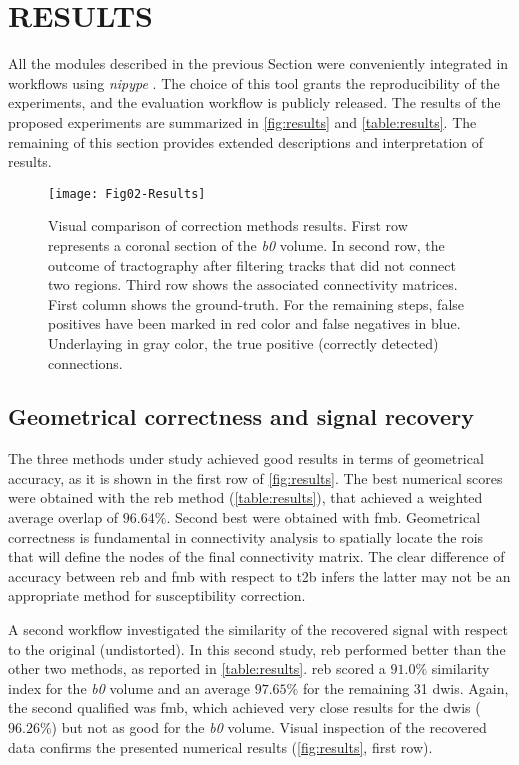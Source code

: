 \section{RESULTS}
\label{sec:results}

All the modules described in the previous Section were
conveniently integrated in workflows using \emph{nipype}
\cite{gorgolewski_nipype:_2011}. The choice of this tool
grants the reproducibility of the experiments,
and the evaluation workflow is publicly released.
The results of the proposed experiments are summarized
in \autoref{fig:results} and \autoref{table:results}.
The remaining of this section provides extended descriptions
and interpretation of results.

\begin{figure*}[tpb]
   \centering
   \texttt{[image: Fig02-Results]}
   \caption{Visual comparison of correction methods results. 
   First row represents
   a coronal section of the \textit{b0} volume. In second row, the outcome
   of tractography after filtering tracks that did not connect two regions.
   Third row shows the associated connectivity matrices. First column shows
   the ground-truth. For the remaining steps, false positives have been marked
   in red color and false negatives in blue. Underlaying in gray color,
   the true positive (correctly detected) connections. }
   \label{fig:results}
\end{figure*}


\subsection{Geometrical correctness and signal recovery}

The three methods under study achieved good results in
terms of geometrical accuracy, as it is shown in the first
row of \autoref{fig:results}. The best numerical scores
were obtained with the \gls*{reb} method (\autoref{table:results}),
that achieved a weighted average overlap of $96.64\%$. Second
best were obtained with \gls*{fmb}. Geometrical correctness
is fundamental in connectivity analysis to spatially locate the
\glspl*{roi} that will define the nodes of the final connectivity
matrix. The clear difference of accuracy between \gls*{reb} and \gls*{fmb}
with respect to \gls*{t2b} infers the latter may not be
an appropriate method for susceptibility correction.



A second workflow investigated the similarity of the recovered
signal with respect to the original (undistorted).
In this second study, \gls*{reb} performed
better than the other two methods, as reported
in \autoref{table:results}. \gls*{reb} scored a $91.0\%$
similarity index for the \textit{b0} volume and an average $97.65\%$
for the remaining 31 \glspl*{dwi}. Again, the second
qualified was \gls*{fmb}, which achieved very close results
for the \glspl*{dwi} ($96.26\%$) but not as good for the \textit{b0}
volume. Visual inspection of the recovered data confirms the 
presented numerical results (\autoref{fig:results}, first row).

